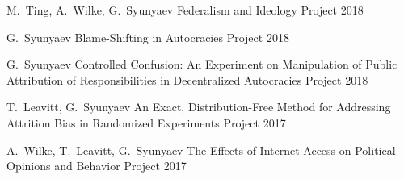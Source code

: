 \begin{cventries}

  \cventry
    {M.~Ting, A.~Wilke, G.~Syunyaev} %
    {Federalism and Ideology} %
    {Project} %
    {2018} %
    {
    }

  \cventry
    {G.~Syunyaev} %
    {Blame-Shifting in Autocracies} %
    {Project} %
    {2018} %
    {
    }

  \cventry
    {G.~Syunyaev} %
    {Controlled Confusion: An Experiment on Manipulation of Public Attribution of Responsibilities in Decentralized Autocracies} %
    {Project} %
    {2018} %
    {
    }

  \cventry
    {T.~Leavitt, G.~Syunyaev} %
    {An Exact, Distribution-Free Method for Addressing Attrition Bias in Randomized Experiments} %
    {Project} %
    {2017} %
    {
    }

  \cventry
    {A.~Wilke, T.~Leavitt, G.~Syunyaev} %
    {The Effects of Internet Access on Political Opinions and Behavior} %
    {Project} %
    {2017} %
    {
    }

\end{cventries}